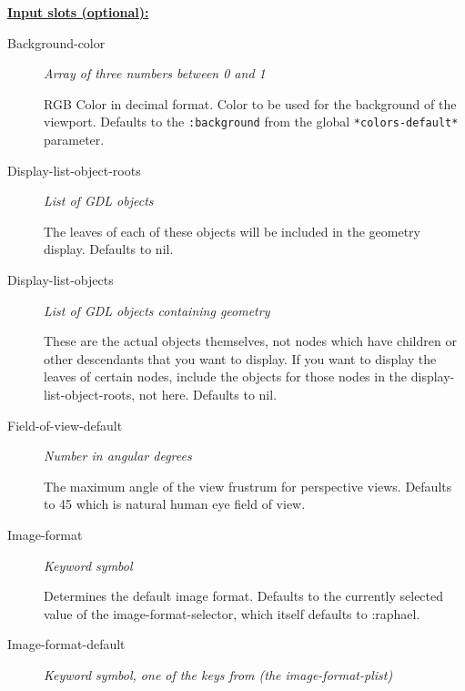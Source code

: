 \documentclass [11pt]{book}
\begin{document}
\begin{itemize}
\textbf{
\underline{Input slots (optional):}}

\begin{description}

\item [Background-color]
\emph{Array of three numbers between 0 and 1}

 RGB Color in decimal
format. Color to be used for the background of the viewport.
Defaults to the
\texttt{:background} from the global \texttt{*colors-default*} parameter.




\item [Display-list-object-roots]
\emph{List of GDL objects}

 The leaves of each of these objects will
be included in the geometry display. Defaults to nil.




\item [Display-list-objects]
\emph{List of GDL objects containing geometry}

 These are the
actual objects themselves, not nodes which have children or
other descendants that you want to display. If you want to
display the leaves of certain nodes, include the objects for
those nodes in the display-list-object-roots, not here.
Defaults to nil.




\item [Field-of-view-default]
\emph{Number in angular degrees}

 The maximum angle of the view frustrum
for perspective views. Defaults to 45 which is natural human eye field of view.




\item [Image-format]
\emph{Keyword symbol}

 Determines the default image format. Defaults to the currently selected
value of the image-format-selector, which itself defaults to :raphael.




\item [Image-format-default]
\emph{Keyword symbol, one of the keys from (the image-format-plist)}


\end{description}
\end{itemize}
\end{document}
